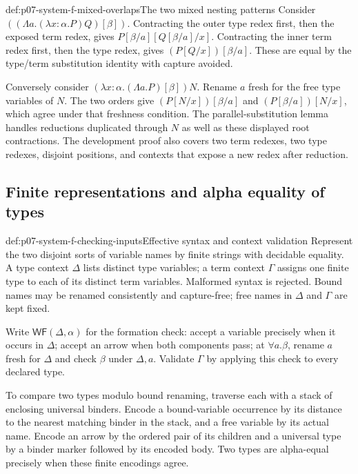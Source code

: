 \begin{hbexample}{def:p07-system-f-mixed-overlaps}{The two mixed nesting patterns}
Consider \(((\Lambda a.(\lambda x{:}\alpha.P)Q)[\beta])\).
Contracting the outer type redex first, then the exposed term redex, gives
\(P[\beta/a][Q[\beta/a]/x]\). Contracting the inner term redex
first, then the type redex, gives \((P[Q/x])[\beta/a]\).
These are equal by the type/term substitution identity with capture
avoided.

Conversely consider \((\lambda x{:}\alpha.(\Lambda a.P)[\beta])N\).
Rename \(a\) fresh for the free type variables of \(N\).
The two orders give \((P[N/x])[\beta/a]\) and
\((P[\beta/a])[N/x]\), which agree under that freshness condition.
The parallel-substitution lemma handles reductions duplicated through
\(N\) as well as these displayed root contractions. The development
proof also covers two term redexes, two type redexes, disjoint positions,
and contexts that expose a new redex after reduction.
\end{hbexample}

\subsection{Finite representations and alpha equality of types}
\label{sec:p07-system-f-checking-types}

\begin{hbdefinition}{def:p07-system-f-checking-inputs}{Effective syntax and context validation}
Represent the two disjoint sorts of variable names by finite strings with
decidable equality. A type context \(\Delta\) lists distinct type
variables; a term context \(\Gamma\) assigns one finite type to each
of its distinct term variables. Malformed syntax is rejected.
Bound names may be renamed consistently and capture-free; free names in
\(\Delta\) and \(\Gamma\) are kept fixed.

Write \(\mathsf{WF}(\Delta,\alpha)\) for the formation check:
accept a variable precisely when it occurs in \(\Delta\); accept
an arrow when both components pass; at \(\forall a.\beta\), rename
\(a\) fresh for \(\Delta\) and check \(\beta\) under \(\Delta,a\).
Validate \(\Gamma\) by applying this check to every declared type.

To compare two types modulo bound renaming, traverse each with a stack
of enclosing universal binders. Encode a bound-variable occurrence by
its distance to the nearest matching binder in the stack, and a free
variable by its actual name. Encode an arrow by the ordered pair of its
children and a universal type by a binder marker followed by its encoded
body. Two types are alpha-equal precisely when these finite encodings agree.
\end{hbdefinition}

